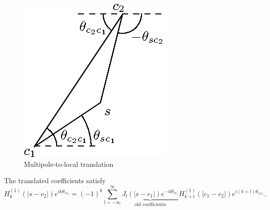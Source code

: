 \documentclass[10pt]{article}
\begin{document}
\begin{figure}[H]
\centering
\includegraphics{media/m2l-translation.eps}
\caption{Multipole-to-local translation}
\end{figure}

The translated coefficients satisfy
%
\[ H_k^{(1)}(|s - c_2|) e^{i k \theta_{sc_2}} = (-1)^k \sum_{l = -\infty}^{\infty}
\underbrace{J_l(|s - c_1|) e^{- i l \theta_{sc_1}}}_{\textrm{old coefficients}}
H_{k + l}^{(1)}(|c_1 - c_2|) e^{i(k + l)\theta_{c_2c_1}}. \]
\end{document}
